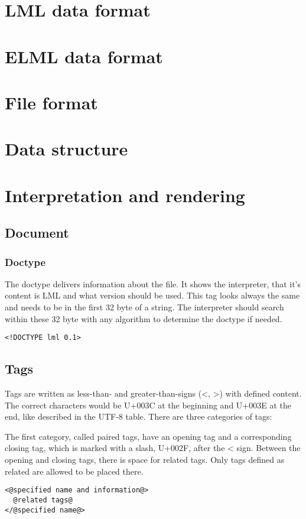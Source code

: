 \documentclass[12pt,a4paper]{article}
\begin{document}
\section{LML data format}

\section{ELML data format}

\section{File format}

\section{Data structure}

\section{Interpretation and rendering}

\subsection{Document}


\subsubsection*{Doctype}
The doctype delivers information about the file. It shows the interpreter, that it's content is LML and what version should be used. This tag looks always the same and needs to be in the first 32 byte of a string. The interpreter should search within these 32 byte with any algorithm to determine the doctype if needed.
\begin{lstlisting}[frame=single,style=base]
<!DOCTYPE lml 0.1>
\end{lstlisting}

\subsection{Tags}

Tags are written as less-than- and greater-than-signs (<, >) with defined content. The correct characters would be  U+003C at the beginning and U+003E at the end, like described in the UTF-8 table. There are three categories of tags:

The first category, called paired tags, have an opening tag and a corresponding closing tag, which is marked with a slash, U+002F, after the < sign. Between the opening and closing tags, there is space for related tags. Only tags defined as related are allowed to be placed there.
\begin{lstlisting}[frame=single,style=base]
<@specified name and information@>
  @related tags@
</@specified name@>
\end{lstlisting}
\end{document}

